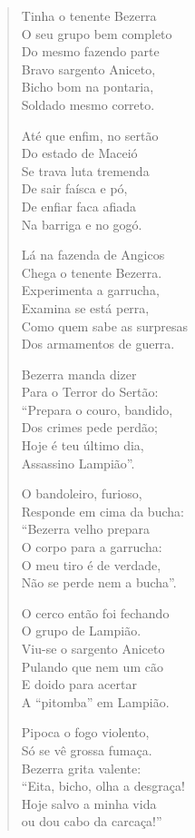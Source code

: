 \begin{verse}
Tinha o tenente Bezerra\\
O seu grupo bem completo\\
Do mesmo fazendo parte\\
Bravo sargento Aniceto,\\
Bicho bom na pontaria,\\
Soldado mesmo correto.


Até que enfim, no sertão\\
Do estado de Maceió\\
Se trava luta tremenda\\
De sair faísca e pó,\\
De enfiar faca afiada\\
Na barriga e no gogó.

Lá na fazenda de Angicos\\
Chega o tenente Bezerra.\\
Experimenta a garrucha,\\
Examina se está perra,\\
Como quem sabe as surpresas\\
Dos armamentos de guerra.

Bezerra manda dizer\\
Para o Terror do Sertão:\\
“Prepara o couro, bandido,\\
Dos crimes pede perdão;\\
Hoje é teu último dia,\\
Assassino Lampião”.

O bandoleiro, furioso,\\
Responde em cima da bucha:\\
“Bezerra velho prepara\\
O corpo para a garrucha:\\
O meu tiro é de verdade,\\
Não se perde nem a bucha”.


O cerco então foi fechando\\
O grupo de Lampião.\\
Viu-se o sargento Aniceto\\
Pulando que nem um cão\\
E doido para acertar\\
A “pitomba” em Lampião.

Pipoca o fogo violento,\\
Só se vê grossa fumaça.\\
Bezerra grita valente:\\
“Eita, bicho, olha a desgraça!\\
Hoje salvo a minha vida\\
ou dou cabo da carcaça!”


\end{verse}
